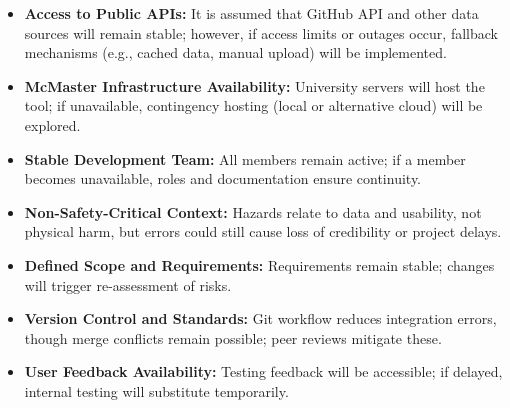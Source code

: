 \documentclass{article}
\begin{document}
\begin{itemize}
    \item \textbf{Access to Public APIs:} It is assumed that GitHub API and other
    data sources will remain stable; however, if access limits or outages occur,
    fallback mechanisms (e.g., cached data, manual upload) will be implemented.
    
    \item \textbf{McMaster Infrastructure Availability:} University servers will
    host the tool; if unavailable, contingency hosting (local or alternative
    cloud) will be explored.
    
    \item \textbf{Stable Development Team:} All members remain active; if a
    member becomes unavailable, roles and documentation ensure continuity.
    
    \item \textbf{Non-Safety-Critical Context:} Hazards relate to data and
    usability, not physical harm, but errors could still cause loss of
    credibility or project delays.
    
    \item \textbf{Defined Scope and Requirements:} Requirements remain stable;
    changes will trigger re-assessment of risks.
    
    \item \textbf{Version Control and Standards:} Git workflow reduces
    integration errors, though merge conflicts remain possible; peer reviews
    mitigate these.
    
    \item \textbf{User Feedback Availability:} Testing feedback will be
    accessible; if delayed, internal testing will substitute temporarily.
\end{itemize}
\end{document}
